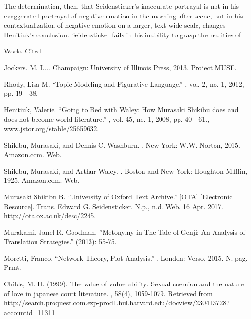 \documentclass[12pt]{article}
\newcommand{\bibent}{\noindent \hangindent 40pt}
\newenvironment{workscited}{\newpage \begin{center} Works Cited \end{center}}{\newpage }
\begin{document}
\begin{flushleft}
\begin{spacing}{2.0}
The determination, then, that Seidensticker's inaccurate portrayal is not in his exaggerated portrayal of negative emotion in the morning-after scene, but in his contextualization of negative emotion on a larger, text-wide scale, changes Henitiuk's conclusion. Seidensticker fails in his inability to grasp the realities of 

\begin{workscited}

\bibent Jockers, M. L... Champaign: University of Illinois Press, 2013. Project MUSE.

\bibent Rhody, Lisa M. ``Topic Modeling and Figurative Language.'' , vol. 2, no. 1, 2012, pp. 19---38.

\bibent Henitiuk, Valerie. ``Going to Bed with Waley: How Murasaki Shikibu does and does not become world literature.'' , vol. 45, no. 1, 2008, pp. 40---61., www.jstor.org/stable/25659632.

\bibent Shikibu, Murasaki, and Dennis C. Washburn. . New York: W.W. Norton, 2015. Amazon.com. Web.

\bibent Shikibu, Murasaki, and Arthur Waley. . Boston and New York: Houghton Mifflin, 1925. Amazon.com. Web.

\bibent Murasaki Shikibu B. ''University of Oxford Text Archive.'' [OTA]  [Electronic Resource]. Trans. Edward G. Seidensticker. N.p., n.d. Web. 16 Apr. 2017. http://ota.ox.ac.uk/desc/2245.

\bibent Murakami, Janel R. Goodman. ''Metonymy in The Tale of Genji: An Analysis of Translation Strategies.''  (2013): 55-75.

\bibent Moretti, Franco. ``Network Theory, Plot Analysis.'' . London: Verso, 2015. N. pag. Print.

\bibent Childs, M. H. (1999). The value of vulnerability: Sexual coercion and the nature of love in japanese court literature. , 58(4), 1059-1079. Retrieved from http://search.proquest.com.ezp-prod1.hul.harvard.edu/docview/230413728?accountid=11311
\end{workscited}


\end{spacing}
\end{flushleft}
\end{document}
